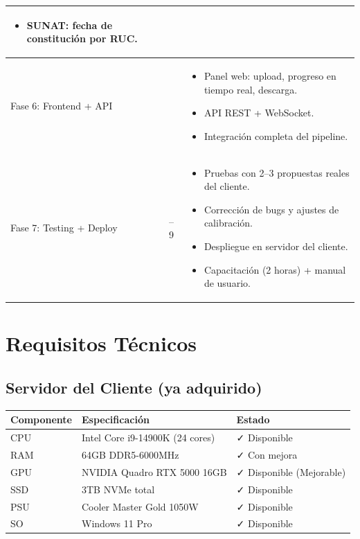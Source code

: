 \documentclass[11pt,a4paper]{article}
\begin{document}
\begin{center}
\begin{tabular}{|>{\raggedright\arraybackslash}m{3.8cm}|>{\centering\arraybackslash}m{1.3cm}|>{\raggedright\arraybackslash}m{7.5cm}|}
\begin{itemize}[leftmargin=*,nosep]
\item SUNAT: fecha de constitución por RUC.
\end{itemize} \\
\hline
Fase 6: Frontend + API & 7 &
\begin{itemize}[leftmargin=*,nosep]
\item Panel web: upload, progreso en tiempo real, descarga.
\item API REST + WebSocket.
\item Integración completa del pipeline.
\end{itemize} \\
\hline
Fase 7: Testing + Deploy & 8 -- 9 &
\begin{itemize}[leftmargin=*,nosep]
\item Pruebas con 2--3 propuestas reales del cliente.
\item Corrección de bugs y ajustes de calibración.
\item Despliegue en servidor del cliente.
\item Capacitación (2 horas) + manual de usuario.
\end{itemize} \\
\hline
\end{tabular}
\end{center}

\section{Requisitos Técnicos}

\subsection{Servidor del Cliente (ya adquirido)}

\begin{center}
\begin{tabular}{|>{\raggedright\arraybackslash}m{3cm}|>{\raggedright\arraybackslash}m{5cm}|>{\centering\arraybackslash}m{3cm}|}
\hline
\textbf{Componente} & \textbf{Especificación} & \textbf{Estado} \\
\hline
CPU & Intel Core i9-14900K (24 cores) & ✓ Disponible \\
\hline
RAM & 64GB DDR5-6000MHz & ✓ Con mejora \\
\hline
GPU & NVIDIA Quadro RTX 5000 16GB & ✓ Disponible (Mejorable) \\
\hline
SSD & 3TB NVMe total & ✓ Disponible \\
\hline
PSU & Cooler Master Gold 1050W & ✓ Disponible \\
\hline
SO & Windows 11 Pro & ✓ Disponible \\
\hline
\end{tabular}
\end{center}
\end{document}
